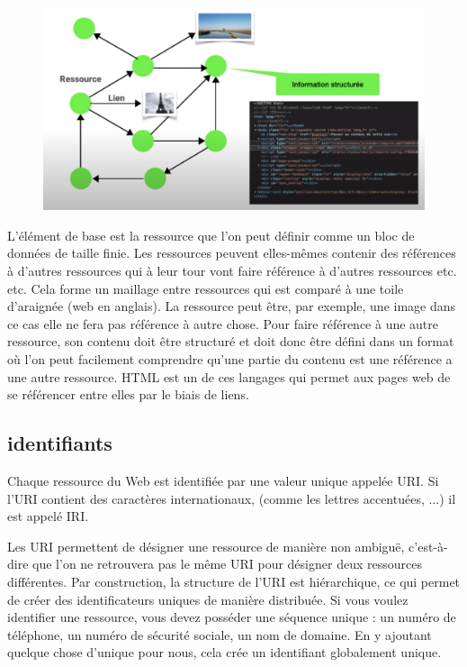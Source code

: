    \begin{figure}
\centerline{\includegraphics[width=.6\columnwidth]{web.png}}
\end{figure}
   L'élément de base est la ressource que l'on peut définir comme un bloc de données de taille finie. Les ressources peuvent elles-mêmes contenir des références à d'autres ressources qui à leur tour vont faire référence à d'autres ressources etc. etc. Cela forme un maillage entre ressources qui est comparé à une toile d'araignée (web en anglais). La ressource peut être, par exemple, une image dans ce cas elle ne fera pas référence à autre chose. Pour faire référence à une autre ressource, son contenu doit être structuré et doit donc être défini dans un format où l'on peut facilement comprendre qu'une partie du contenu est une référence a une autre ressource. HTML est un de ces langages qui permet aux pages web de se référencer entre elles par le biais de liens. 
  
      \vspace{1em}

\subsection{identifiants} 

    \vspace{1em}

   
   Chaque ressource du Web est identifiée par une valeur unique appelée \ac{URI}. Si l’URI contient des caractères internationaux, (comme les lettres accentuées, ...)   il est appelé \ac{IRI}.

Les \ac{URI} permettent de désigner une ressource de manière non ambiguë, c'est-à-dire que l'on ne retrouvera pas le même \ac{URI} pour désigner deux ressources différentes.  Par construction, la structure de l’\ac{URI} est hiérarchique, ce qui permet de créer des identificateurs uniques de manière distribuée. Si vous voulez identifier une ressource, vous devez posséder une séquence unique : un numéro de téléphone, un numéro de sécurité sociale, un nom de domaine. En y ajoutant quelque chose d'unique pour nous, cela crée un identifiant globalement unique. 

